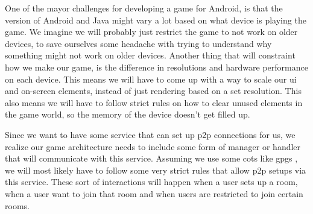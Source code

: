One of the mayor challenges for developing a game for Android, is that the version of Android and Java might vary a lot based on what device is playing the game. We imagine we will probably just restrict the game to not work on older devices, to save ourselves some headache with trying to understand why something might not work on older devices. Another thing that will constraint how we make our game, is the difference in resolutions and hardware performance on each device. This means we will have to come up with a way to scale our \gls{ui} and on-screen elements, instead of just rendering based on a set resolution. This also means we will have to follow strict rules on how to clear unused elements in the game world, so the memory of the device doesn't get filled up.

Since we want to have some service that can set up \gls{p2p} connections for us, we realize our game architecture needs to include some form of manager or handler that will communicate with this service. Assuming we use some \gls{cots} like \gls{gpgs} \citep{gpgs}, we will most likely have to follow some very strict rules that allow \gls{p2p} setups via this service. These sort of interactions will happen when a user sets up a room, when a user want to join that room and when users are restricted to join certain rooms.
